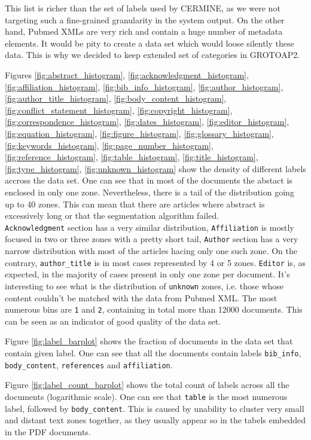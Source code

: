 This list is richer than the set of labels used by CERMINE, as we were not targeting such a fine-grained granularity in the system output. On the other hand, Pubmed XMLs are very rich and contain a huge number of metadata elements. It would be pity to create a data set which would loose silently these data. This is why we decided to keep extended set of categories in GROTOAP2.

Figures \ref{fig:abstract_histogram}, \ref{fig:acknowledgment_histogram}, \ref{fig:affiliation_histogram}, \ref{fig:bib_info_histogram}, \ref{fig:author_histogram}, \ref{fig:author_title_histogram}, \ref{fig:body_content_histogram}, \ref{fig:conflict_statement_histogram}, \ref{fig:copyright_histogram}, \ref{fig:correspondence_histogram}, \ref{fig:dates_histogram}, \ref{fig:editor_histogram}, \ref{fig:equation_histogram}, \ref{fig:figure_histogram}, \ref{fig:glossary_histogram}, \ref{fig:keywords_histogram}, \ref{fig:page_number_histogram}, \ref{fig:reference_histogram}, \ref{fig:table_histogram}, \ref{fig:title_histogram}, \ref{fig:type_histogram}, \ref{fig:unknown_histogram} show the density of different labels accross the data set. One can see that in most of the documents the abstact is enclosed in only one zone. Nevertheless, there is a tail of the distribution going up to 40 zones. This can mean that there are articles where abstract is excessively long or that the segmentation algorithm failed. \\

\verb+Acknowledgment+ section has a very similar distribution, \verb+Affiliation+ is mostly focused in two or three zones with a pretty short tail, \verb+Author+ section has a very narrow distribution with most of the articles hacing only one such zone. On the contrary, \verb+author_title+ is in most cases represented by 4 or 5 zones. \verb+Editor+ is, as expected, in the majority of cases present in only one zone per document. It's interesting to see what is the distribution of \verb+unknown+ zones, i.e. those whose content couldn't be matched with the data from Pubmed XML. The most numerous bins are \verb+1+ and \verb+2+, containing in total more than 12000 documents. This can be seen as an indicator of good quality of the data set.

Figure \ref{fig:label_barplot} shows the fraction of documents in the data set that contain given label. One can see that all the documents contain labels \verb+bib_info+, \verb+body_content+, \verb+references+ and \verb+affiliation+.

Figure \ref{fig:label_count_barplot} shows the total count of labels across all the documents (logarithmic scale). One can see that \verb+table+ is the most numerous label, followed by \verb+body_content+. This is caused by unability to cluster very small and distant text zones together, as they usually appear so in the tabels embedded in the PDF documents.

